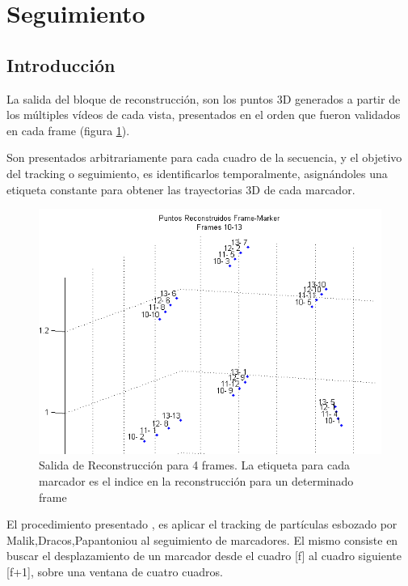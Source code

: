 \section{Seguimiento}

\subsection{Introducción}

La salida del bloque de reconstrucción, son los puntos 3D generados a partir de los múltiples vídeos de cada vista, presentados en el orden que fueron validados en cada frame (figura \ref{reconstr_00}).

Son presentados arbitrariamente para cada cuadro de la secuencia, y el objetivo del tracking o seguimiento, es identificarlos temporalmente, asignándoles una etiqueta constante para obtener las trayectorias 3D de cada marcador.

\begin{figure}[hbt]
\begin{center}
\includegraphics[scale=0.8]{img/Tracking/00_Salida_Reconstruccion}
\end{center}
\caption{Salida de Reconstrucción para 4 frames. La etiqueta para cada marcador es el indice en la reconstrucción para un determinado frame}
\label{reconstr_00}
\end{figure}

El procedimiento presentado \cite{herda} , es aplicar el tracking de partículas esbozado por Malik,Dracos,Papantoniou \cite{griegos} al seguimiento de marcadores. El mismo consiste en buscar el desplazamiento de un marcador desde el cuadro [f] al cuadro siguiente [f+1], sobre una ventana de cuatro cuadros. 

